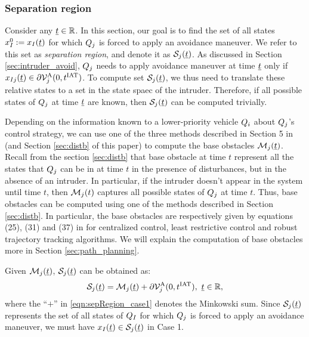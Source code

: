\subsubsection{Separation region} \label{sec:sepRegion_case1}
Consider any $\underline{t} \in \mathbb{R}$. In this section, our goal is to find the set of all states $x_{I}^0 := x_{I}(\underline{t})$ for which $Q_j$ is forced to apply an avoidance maneuver. We refer to this set as \textit{separation region}, and denote it as $\mathcal{S}_j(\underline{t})$. As discussed in Section \ref{sec:intruder_avoid}, $Q_j$ needs to apply avoidance maneuver at time $\underline{t}$ only if $x_{I j}(\underline{t}) \in \partial \mathcal{V}^{\text{A}}_{j}(0, t^\text{IAT})$. To compute set $\mathcal{S}_j(\underline{t})$, we thus need to translate these relative states to a set in the state spaec of the intruder. Therefore, if all possible states of $Q_j$ at time $\underline{t}$ are known, then $\mathcal{S}_j(\underline{t})$ can be computed trivially.

Depending on the information known to a lower-priority vehicle $Q_i$ about $Q_j$'s control strategy, we can use one of the three methods described in Section 5 in \cite{chen2016robust} (and Section \ref{sec:distb} of this paper) to compute the base obstacles $\mathcal{M}_j(\underline{t})$. Recall from the section \ref{sec:distb} that base obstacle at time $t$ represent all the states that $Q_j$ can be in at time $t$ in the presence of disturbances, but in the absence of an intruder. In particular, if the intruder doesn't appear in the system until time $t$, then  $\mathcal{M}_j(t)$ captures all possible states of $Q_j$ at time $t$. Thus, base obstacles can be computed using one of the methods described in Section \ref{sec:distb}. In particular, the base obstacles are respectively given by equations (25), (31) and (37) in \cite{chen2016robust} for centralized control, least restrictive control and robust trajectory tracking algorithms. We will explain the computation of base obstacles more in Section \ref{sec:path_planning}.

Given $\mathcal{M}_j(\underline{t})$, $\mathcal{S}_j(\underline{t})$ can be obtained as:
\begin{equation} \label{eqn:sepRegion_case1}
\sep_j(\tsa) = \boset_j(\tsa) + \partial \brs^{\text{A}}_{j}(0, \iat), ~\tsa \in \R,
\end{equation}
where the ``$+$'' in \eqref{eqn:sepRegion_case1} denotes the Minkowski sum. Since $\mathcal{S}_j(\underline{t})$ represents the set of all states of $Q_I$ for which $Q_j$ is forced to apply an avoidance maneuver, we must have $x_{I}(\underline{t}) \in \mathcal{S}_j(\underline{t})$ in Case 1.
